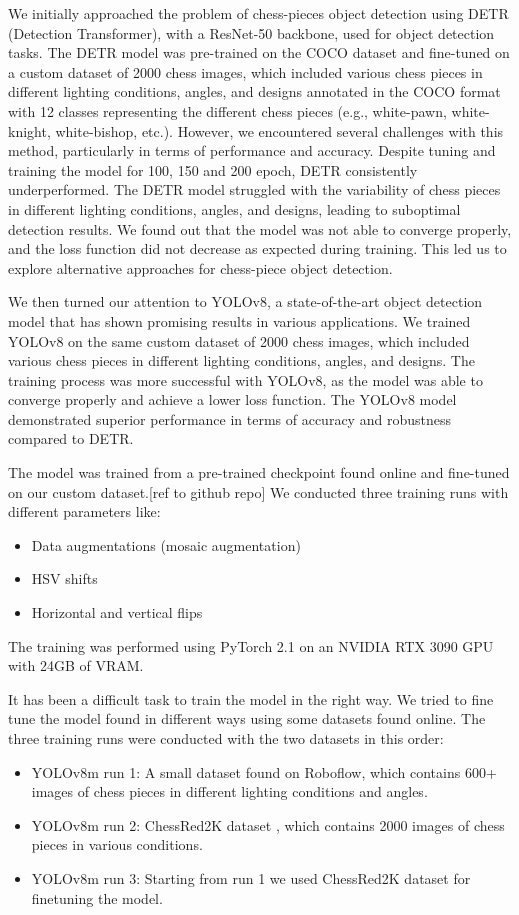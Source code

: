 We initially approached the problem of chess-pieces object detection using DETR (Detection Transformer), with a ResNet-50 backbone, used for object detection tasks.
The DETR model was pre-trained on the COCO dataset and fine-tuned on a custom dataset of 2000 chess images, which included various chess pieces in different lighting conditions,
 angles, and designs annotated in the COCO format with 12 classes representing the different chess pieces (e.g., white-pawn, white-knight, white-bishop, etc.).
However, we encountered several challenges with this method, particularly in terms of performance and accuracy.
Despite tuning and training the model for 100, 150 and 200 epoch, DETR consistently underperformed.
The DETR model struggled with the variability of chess pieces in different lighting conditions, angles, and designs, leading to suboptimal detection results.
We found out that the model was not able to converge properly, and the loss function did not decrease as expected during training.
This led us to explore alternative approaches for chess-piece object detection.

We then turned our attention to YOLOv8, a state-of-the-art object detection model that has shown promising results in various applications.
We trained YOLOv8 on the same custom dataset of 2000 chess images, which included various chess pieces in different lighting conditions, angles, and designs.
The training process was more successful with YOLOv8, as the model was able to converge properly and achieve a lower loss function.
The YOLOv8 model demonstrated superior performance in terms of accuracy and robustness compared to DETR.

The model was trained from a pre-trained checkpoint found online and fine-tuned on our custom dataset.[ref to github repo]
We conducted three training runs with different parameters like:
\begin{itemize}
    \item Data augmentations (mosaic augmentation)
    \item HSV shifts
    \item Horizontal and vertical flips
\end{itemize}
The training was performed using PyTorch 2.1 on an NVIDIA RTX 3090 GPU with 24GB of VRAM.

It has been a difficult task to train the model in the right way.
We tried to fine tune the model found in different ways using some datasets found online.
The three training runs were conducted with the two datasets in this order:
\begin{itemize}
    \item YOLOv8m run 1: A small dataset found on Roboflow, which contains 600+ images of chess pieces in different lighting conditions and angles. \cite{cpd:dataset:yolosmall}
    \item YOLOv8m run 2: ChessRed2K dataset \cite{cpd:dataset:chessred2k}, which contains 2000 images of chess pieces in various conditions.
    \item YOLOv8m run 3: Starting from run 1 we used ChessRed2K dataset for finetuning the model.
\end{itemize}



